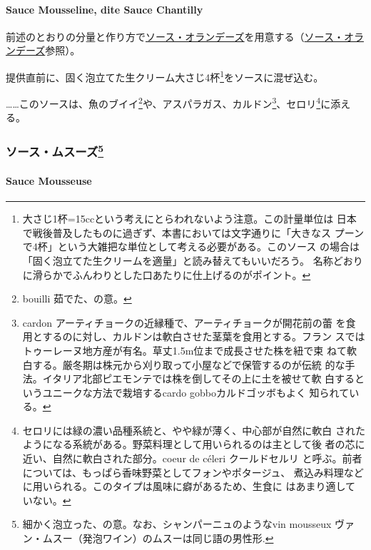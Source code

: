 \begin{recette}
\hypertarget{sauce-mousseline}{%
\paragraph{Sauce Mousseline, dite Sauce
Chantilly}\label{sauce-mousseline}}

前述のとおりの分量と作り方で\protect\hyperlink{sauce-hollandaise}{ソース・オランデーズ}を用意する（\protect\hyperlink{sauce-hollandaise}{ソース・オランデーズ}参照）。

提供直前に、固く泡立てた生クリーム大さじ4杯\footnote{大さじ1杯=15ccという考えにとらわれないよう注意。この計量単位は
  日本で戦後普及したものに過ぎず、本書においては文字通りに「大きなス
  プーンで4杯」という大雑把な単位として考える必要がある。このソース
  の場合は「固く泡立てた生クリームを適量」と読み替えてもいいだろう。
  名称どおりに滑らかでふんわりとした口あたりに仕上げるのがポイント。}をソースに混ぜ込む。

\ldots{}\ldots{}このソースは、魚のブイイ\footnote{bouilli 茹でた、の意。}や、アスパラガス、カルドン\footnote{cardon
  アーティチョークの近縁種で、アーティチョークが開花前の蕾
  を食用とするのに対し、カルドンは軟白させた茎葉を食用とする。フラン
  スではトゥーレーヌ地方産が有名。草丈1.5m位まで成長させた株を紐で束
  ねて軟白する。厳冬期は株元から刈り取って小屋などで保管するのが伝統
  的な手法。イタリア北部ピエモンテでは株を倒してその上に土を被せて軟
  白するというユニークな方法で栽培するcardo gobboカルドゴッボもよく
  知られている。}、セロリ\footnote{セロリには緑の濃い品種系統と、やや緑が薄く、中心部が自然に軟白
  されたようになる系統がある。野菜料理として用いられるのは主として後
  者の芯に近い、自然に軟白された部分。coeur de céleri クールドセルリ
  と呼ぶ。前者については、もっぱら香味野菜としてフォンやポタージュ、
  煮込み料理などに用いられる。このタイプは風味に癖があるため、生食に
  はあまり適していない。}に添える。

\maeaki

\hypertarget{ux30bdux30fcux30b9ux30e0ux30b9ux30fcux30ba90}{%
\subsubsection[ソース・ムスーズ]{\texorpdfstring{ソース・ムスーズ\footnote{細かく泡立った、の意。なお、シャンパーニュのようなvin
  mousseux ヴァン・ムスー（発泡ワイン）のムスーは同じ語の男性形.}}{ソース・ムスーズ}}\label{ux30bdux30fcux30b9ux30e0ux30b9ux30fcux30ba90}}

\hypertarget{sauce-mousseuse}{%
\paragraph{Sauce Mousseuse}\label{sauce-mousseuse}}


\end{recette}
